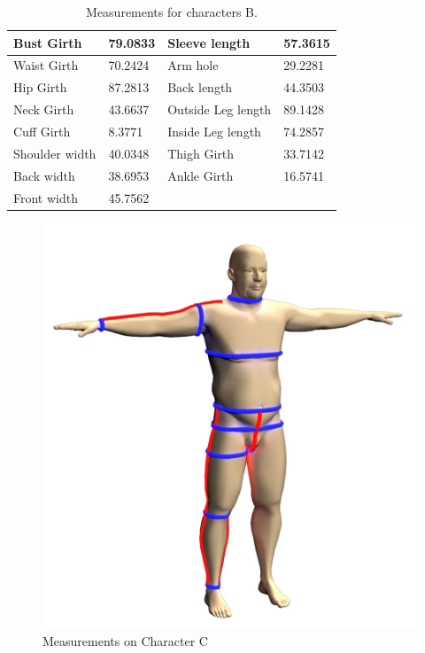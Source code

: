 \begin{table}[H]
    \centering
    \begin{tabular}{|p{3.4cm}|p{1.8cm}|p{3.4cm}|p{1.8cm}|}
        \hline
        Bust Girth & 79.0833 & Sleeve length & 57.3615\\
        \hline
        Waist Girth & 70.2424 & Arm hole & 29.2281\\
        \hline
        Hip Girth & 87.2813 & Back length & 44.3503\\
        \hline
        Neck Girth &43.6637 & Outside Leg length & 89.1428\\
        \hline
        Cuff Girth &8.3771 & Inside Leg length & 74.2857\\
        \hline
        Shoulder width &40.0348 & Thigh Girth & 33.7142\\
        \hline
        Back width &38.6953 & Ankle  Girth & 16.5741\\
        \hline
        Front width &45.7562 &  &  \\
        \hline        
    \end{tabular}
    \caption{Measurements for characters B.} %
    \label{table:measurements_result_B}
\end{table}


\begin{figure}[H]
\includegraphics[width=\textwidth]{../images/geodesic_image/C_measurement}
\caption{Measurements on Character C}
\label{figure:C_all_measurement} 
\end{figure}

